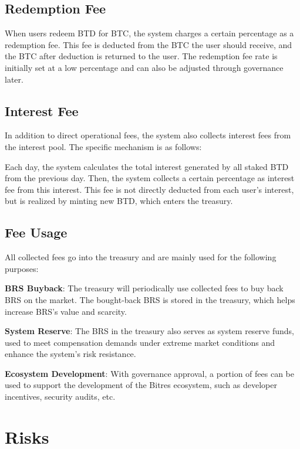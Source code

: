 \documentclass{article}
\begin{document}
\subsection{Redemption Fee}

When users redeem BTD for BTC, the system charges a certain percentage as a redemption fee. This fee is deducted from the BTC the user should receive, and the BTC after deduction is returned to the user. The redemption fee rate is initially set at a low percentage and can also be adjusted through governance later.

\subsection{Interest Fee}

In addition to direct operational fees, the system also collects interest fees from the interest pool. The specific mechanism is as follows:

Each day, the system calculates the total interest generated by all staked BTD from the previous day. Then, the system collects a certain percentage as interest fee from this interest. This fee is not directly deducted from each user's interest, but is realized by minting new BTD, which enters the treasury.

\subsection{Fee Usage}

All collected fees go into the treasury and are mainly used for the following purposes:

\textbf{BRS Buyback}: The treasury will periodically use collected fees to buy back BRS on the market. The bought-back BRS is stored in the treasury, which helps increase BRS's value and scarcity.

\textbf{System Reserve}: The BRS in the treasury also serves as system reserve funds, used to meet compensation demands under extreme market conditions and enhance the system's risk resistance.

\textbf{Ecosystem Development}: With governance approval, a portion of fees can be used to support the development of the Bitres ecosystem, such as developer incentives, security audits, etc.

\section{Risks}
\end{document}
